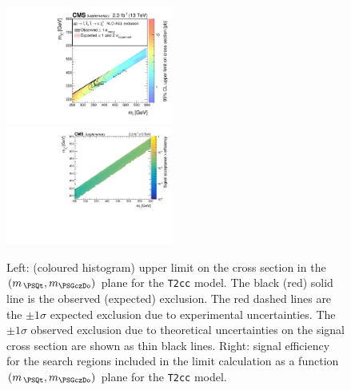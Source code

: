\clearpage
\begin{figure}[!h]
  \begin{center}
    \includegraphics[width=0.49\textwidth]{Supplementary/RA1T2ccXSEC_aux} \, 
    \includegraphics[width=0.49\textwidth]{Supplementary/T2cc_merging_4_cats_aux} \,     
  \end{center}
  \caption{Left: (coloured histogram) upper limit on the cross section in the $(m_{\,\PSQt}, m_{\PSGczDo})$ plane for the \texttt{T2cc} model. 
  The black (red) solid line is the observed (expected) exclusion. The red dashed lines are the $\pm1\sigma$ expected exclusion due to experimental uncertainties. 
  The $\pm1\sigma$ observed exclusion due to theoretical uncertainties on the signal cross section are shown as thin black lines. 
  Right: signal efficiency for the search regions included in the limit calculation as a function $(m_{\,\PSQt}, m_{\PSGczDo})$ plane for the \texttt{T2cc} model. 
  \label{fig:T2cc_excl}}
\end{figure}


